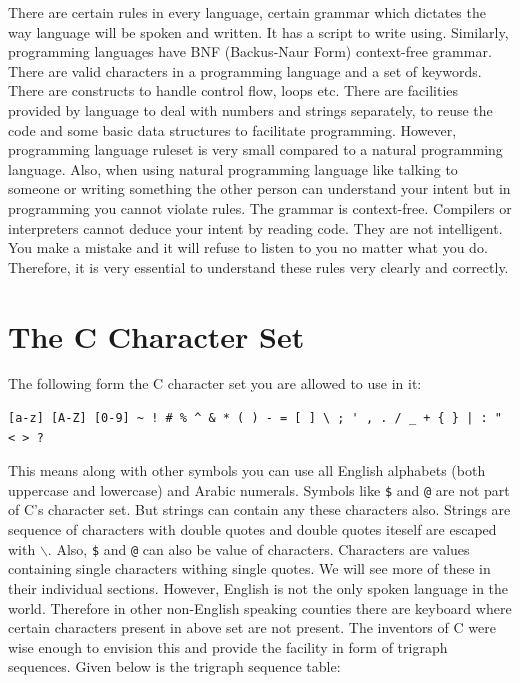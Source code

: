 There are certain rules in every language, certain grammar which dictates the
way language will be spoken and written. It has a script to write
using. Similarly, programming languages have BNF (Backus-Naur Form)
context-free grammar. There are valid characters in a programming language and
a set of keywords. There are constructs to handle control flow, loops
etc. There are facilities provided by language to deal with numbers and strings
separately, to reuse the code and some basic data structures to facilitate
programming. However, programming language ruleset is very small compared
to a natural programming language. Also, when using natural programming
language like talking to someone or writing something the other person can
understand your intent but in programming you cannot violate rules. The grammar
is context-free. Compilers or interpreters cannot deduce your intent by reading
code. They are not intelligent. You make a mistake and it will refuse to listen
to you no matter what you do. Therefore, it is very essential to understand
these rules very clearly and correctly.

\section{The C Character Set}
The following form the C character set you are allowed to use in it:

\begin{Verbatim}[frame=single]
[a-z] [A-Z] [0-9] ~ ! # % ^ & * ( ) - = [ ] \ ; ' , . / _ + { } | : " < > ?
\end{Verbatim}

This means along with other symbols you can use all English alphabets (both
uppercase and lowercase) and Arabic numerals. Symbols like \texttt{\$} and
\texttt{@} are not part of C's character set. But strings can contain any
these characters also. Strings are sequence of characters with double quotes
and double quotes iteself are escaped with \texttt{$\backslash$}. Also,
\texttt{\$} and \texttt{@} can also be value of characters. Characters are
values containing single characters withing single quotes. We will see more of
these in their individual sections. However, English is not the only
spoken language in the world. Therefore in other non-English speaking counties
there are keyboard where certain characters present in above set are not
present. The inventors of C were wise enough to envision this and provide the
facility in form of trigraph sequences. Given below is the trigraph sequence
table:

